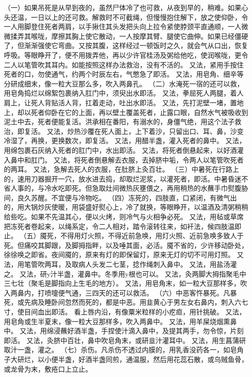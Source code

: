 \documentclass[12pt,UTF8]{ctexbook}
\begin{document}
（一）如果吊死是从早到夜的，虽然尸体冷了也可救，从夜到早的，稍难。如果心头还温，一日以上的还可救。解救时不可截绳，但慢慢抱住解下，放之使仰卧，令一人用脚登住死者两肩，以手揪住其头发把头向上拉令紧使脖颈平直通顺，一人微微揉弄其喉咙，摩擦其胸上使它散动，一人按摩其臂、腿使它曲伸。如果已经僵硬了，但渐渐强使它弯曲。又按其腹，这样经过一顿饭时之久，就会气从口出，恢复呼吸。等眼睁开了，便不用拨弄他，再以少许官桂汤及粥给他吃，使润喉咙，更令二人以笔管吹其耳内。如能按照这样办法救治，没有不活的。
又法，紧用手按住死者的口，勿使通气，约两个时辰左右，气憋急了即活。
又法，用皂角、细辛等分研成细末，像一粒大豆那么多，吹入两鼻孔。
（二）水淹死一宿的还可以救，用皂角捣烂以绵絮包裹纳入肛门中，须臾出水即活。
又法，拳屈死人两腿，着人肩上，让死人背贴活人背，扛着走动，吐出水即活。
又法，先打泥壁一堵，置地上，却以死者仰卧在它的上面，再以壁土覆盖死者，止露口眼，自然水气被吸收到泥土中去，死者便能复活。洪承相在番阳，有溺水的，身僵气绝，用这个法子救治，即复活。
又法，炒热沙覆在死人面上，上下着沙，只留出口、耳、鼻，沙变冷湿了，再换，更换数次，即复活。
又法，用醋半盏，灌入死者的鼻中。
又法，用绵包裹石灰纳入死者的肛门中，水出即活。
又法，将死者倒悬起来，以好酒灌入鼻中和肛门。
又法，将死者倒悬解去衣服，去掉脐中垢，令两人以笔管吹死者的两耳。
又法，急解去死人的衣服，在肚脐上灸百壮。
（三）中暑死在行路上的，速用刀器掘开一穴，放水进去捣，却取烂泥浆，以灌死者，即活。中暑昏迷不省人事的，与冷水吃即死。但急取灶间微热灰壅偎之，再用稍热的水蘸手巾熨腹胁间，良久苏醒。不宜便与冷物吃。
（四）冻死的，四肢直，口紧闭，有微气出的，用大锅炒灰使暖，用袋盛好熨心上，冷了就换，等眼睁开，以温酒及清粥稍稍给些吃。如果不先温其心，便以火烤，则冷气与火相争必死。
又法，用毡或草席把冻死者卷起来，以绳系定，令二人相对，踏令滚转往来，如衦法，候四肢温即止。
（五）魇死，不得用灯火照，不得近前急唤，用灯火照、近前急唤多致人于死。但痛咬其脚跟，及脚拇指畔，以及唾其面，必活。魇不省的，少许移动卧处，徐徐唤之即省。夜间魇的，原来有灯的即保留灯，原来无灯的切不可用灯照。
又法，用笔管吹两耳，及取病人头发二七茎，捻作绳刺入鼻中。
又法，用盐汤灌之。
又法，研y汁半盏，灌鼻中。冬季用y根也可以。
又法，灸两脚大拇指聚毛中三七壮（聚毛是脚指向上生毛的地方）。
又法，用皂角末，如一粒大豆那样多，吹入两鼻内，打喷嚏便气通，三四天的还可以救活。
（六）中恶客忤暴死。凡暴死，或先病及睡卧间忽然而死的，都是中恶。用韭黄心于男左女右鼻内，刺入六七寸，使目间血出即活。
看上唇内沿，有像粟米粒样的小疙疸，用针挑破。
又法，用皂角或生半夏末，像一粒大豆那样多，吹入两鼻中。
又法，用羊屎烧烟熏鼻中。
又法，用绵浸蘸好酒半盏，手捏使汁滴入鼻中，及提其两手，勿令惊，片刻即活。
又法，灸脐中百壮，鼻中吹皂角末，或研韭汁灌耳中。
又法，用生菖蒲研取汁一盏，灌之。
（七）杀伤。凡杀伤不透过内膜的，用乳香没药各一，如皂角子大研烂，以小便半盏，好酒半盏同煎，通温服，然后用花蕊石散，或乌贼鱼骨，或龙骨为末，敷疮口上立止。
\end{document}
